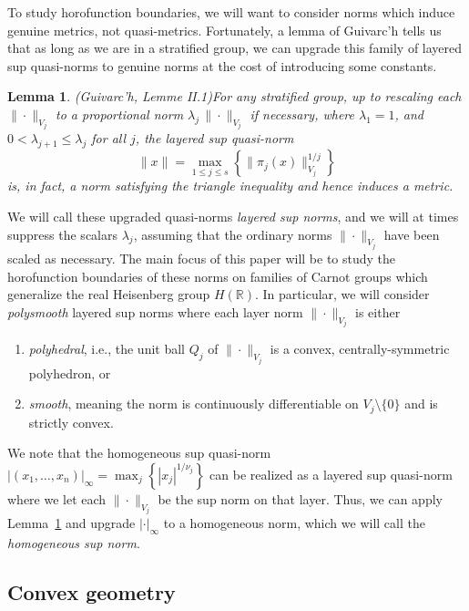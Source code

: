 \documentclass{article}
\newtheorem{lemma}[theorem]{Lemma}
\theoremstyle{definition}
\newcommand{\norm}[1]{\|#1\|}
\newcommand{\HR}{H(\mathbb{R})}
\begin{document}
To study horofunction boundaries, we will want to consider norms which induce genuine metrics, not quasi-metrics. Fortunately, a lemma of Guivarc'h tells us that as long as we are in a stratified group, we can upgrade this family of layered sup quasi-norms to genuine norms at the cost of introducing some constants.

\begin{lemma}(Guivarc'h, \cite{guivarch-quasinorm} Lemme II.1)\label{guivarch}
For any stratified group, up to rescaling each $\norm{\cdot}_{V_j}$ to a proportional norm $\lambda_j\,\norm{\cdot}_{V_j}$ if necessary, where $\lambda_1 = 1$, and  $0 < \lambda_{j+1}\leq \lambda_j$ for all $j$, the layered sup quasi-norm
\[
\norm{x} = \max_{1\leq j \leq s} \left\{\norm{\pi_j(x)}_{V_j}^{1/j}\right \}
\]
is, in fact, a norm satisfying the triangle inequality and hence induces a metric.
\end{lemma}

We will call these upgraded quasi-norms {\em layered sup norms}, and we will at times suppress the scalars $\lambda_j$, assuming that the ordinary norms $\norm{\cdot}_{V_j}$ have been scaled as necessary. The main focus of this paper will be to study the horofunction boundaries of these norms on families of Carnot groups which generalize the real Heisenberg group $\HR$.
In particular, we will consider {\em polysmooth} layered sup norms where each layer norm $\norm{\cdot}_{V_j}$ is either
\begin{enumerate}
\item {\em polyhedral}, i.e., the unit ball $Q_j$ of $\norm{\cdot}_{V_j}$ is a convex, centrally-symmetric polyhedron, or
\item {\em smooth}, meaning the norm is continuously differentiable on $V_j \setminus \{0\}$ and is strictly convex.
\end{enumerate}

We note that the homogeneous sup quasi-norm $|(x_1, \ldots, x_n)|_\infty = \max_{j}\left\{ |x_j|^{1/\nu_j}\right \}$ can be realized as a layered sup quasi-norm where we let each $\norm{\cdot}_{V_j}$ be the sup norm on that layer. Thus, we can apply Lemma~\ref{guivarch} and upgrade $|\cdot|_\infty$ to a homogeneous norm, which we will call the {\em homogeneous sup norm}.




\subsection{Convex geometry}\label{sec:convex}
\end{document}

